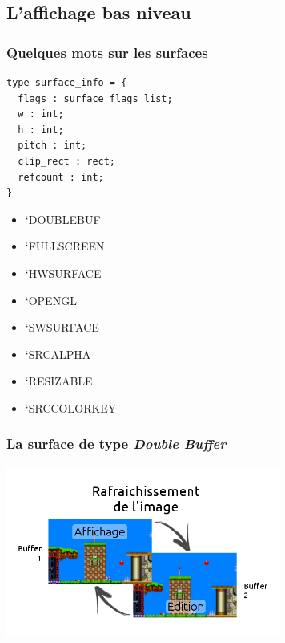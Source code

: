 \subsection{L'affichage bas niveau} %
\begin{frame}[fragile]
	\frametitle{Quelques mots sur les surfaces}
	\begin{minipage}{0.55\textwidth}
		\lstset{basicstyle=\small}
		\begin{lstlisting}
type surface_info = {
  flags : surface_flags list;
  w : int;
  h : int;
  pitch : int;
  clip_rect : rect;
  refcount : int;
}
		\end{lstlisting}
	\end{minipage}
	\begin{minipage}{0.4\textwidth}
		\begin{itemize}
			\item `DOUBLEBUF
			\item `FULLSCREEN
			\item `HWSURFACE
			\item `OPENGL
			\item `SWSURFACE
			\item `SRCALPHA
			\item `RESIZABLE
			\item `SRCCOLORKEY
		\end{itemize}
	\end{minipage}
\end{frame}


\begin{frame}
	\frametitle{La surface de type \textit{Double Buffer}}
	\begin{center}
		\includegraphics[width=9cm]{pics/doubleBuffer.png}
	\end{center}
\end{frame}

